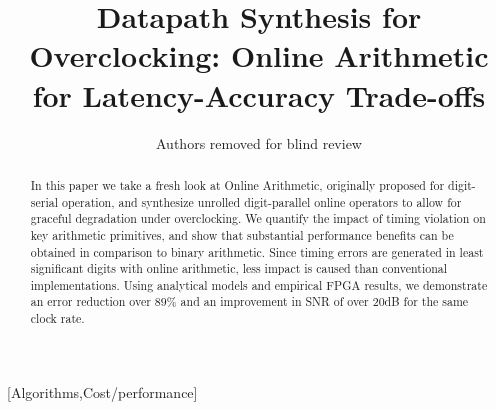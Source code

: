 \documentclass{acm_proc_article-sp}
\begin{document}
\title{Datapath Synthesis for Overclocking: Online Arithmetic for Latency-Accuracy Trade-offs}


%
\author{
\alignauthor
Authors removed for blind review
}

\maketitle

\begin{abstract}
In this paper we take a fresh look at Online Arithmetic, originally proposed for digit-serial operation, and synthesize unrolled digit-parallel online operators to allow for graceful degradation under overclocking. We quantify the impact of timing violation on key arithmetic primitives, and show that substantial performance benefits can be obtained in comparison to binary arithmetic. Since timing errors are generated in least significant digits with online arithmetic, less impact is caused than conventional implementations. Using analytical models and empirical FPGA results, we demonstrate an error reduction over $89\%$ and an improvement in SNR of over 20dB for the same clock rate.
\end{abstract}
%
[Algorithms,Cost/performance]
\end{document}
